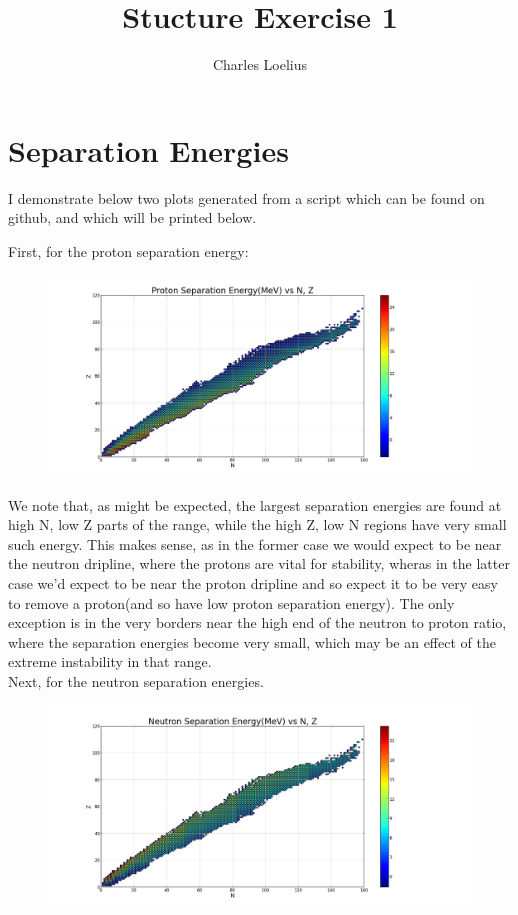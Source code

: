 \documentclass[11pt]{article} %
\title{Stucture Exercise 1}
\author{Charles Loelius}
\begin{document}
\maketitle

\section{Separation Energies}

I demonstrate below two plots generated from a script which can be found on github, and which will be printed below.

First, for the proton separation energy:\\
\vspace{1mm}
\begin{figure}[htbp]
\centering
\includegraphics[width=.7\linewidth]{"ProtonSepEnergy"}
\end{figure}

We note that, as might be expected, the largest separation energies are found at high N, low Z parts of the range, while the high Z, low N regions have very small such energy. This makes sense, as in the former case we would expect to be near the neutron dripline, where the protons are vital for stability, wheras in the latter case we'd expect to be near the proton dripline and so expect it to be very easy to remove a proton(and so have low proton separation energy). The only exception is in the very borders near the high end of the neutron to proton ratio, where the separation energies become very small, which may be an effect of the extreme instability in that range.\\
\newpage
Next, for the neutron separation energies.\\
\begin{figure}[htbp]
\centering
\includegraphics[width=.7\linewidth]{"NeutronSepEnergy"}
\end{figure}
\end{document}

